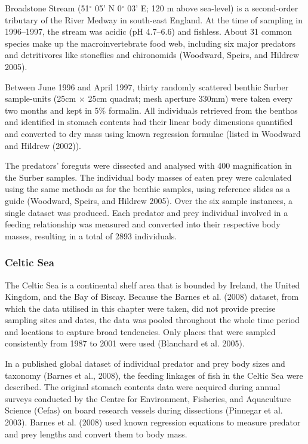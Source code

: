 \documentclass{article}
\begin{document}
Broadstone Stream (51\(^\circ\) 05' N 0\(^\circ\) 03' E; 120 m above
sea-level) is a second-order tributary of the River Medway in south-east
England. At the time of sampling in 1996--1997, the stream was acidic
(pH 4.7--6.6) and fishless. About 31 common species make up the
macroinvertebrate food web, including six major predators and
detritivores like stoneflies and chironomids (Woodward, Speirs, and
Hildrew 2005).

Between June 1996 and April 1997, thirty randomly scattered benthic
Surber sample-units (25cm \(\times\) 25cm quadrat; mesh aperture 330mm)
were taken every two months and kept in 5\% formalin. All individuals
retrieved from the benthos and identified in stomach contents had their
linear body dimensions quantified and converted to dry mass using known
regression formulae (listed in Woodward and Hildrew (2002)).

The predators' foreguts were dissected and analysed with 400
magnification in the Surber samples. The individual body masses of eaten
prey were calculated using the same methods as for the benthic samples,
using reference slides as a guide (Woodward, Speirs, and Hildrew 2005).
Over the six sample instances, a single dataset was produced. Each
predator and prey individual involved in a feeding relationship was
measured and converted into their respective body masses, resulting in a
total of 2893 individuals.

\hypertarget{celtic-sea}{%
\subsubsection{Celtic Sea}\label{celtic-sea}}

The Celtic Sea is a continental shelf area that is bounded by Ireland,
the United Kingdom, and the Bay of Biscay. Because the Barnes et al.
(2008) dataset, from which the data utilised in this chapter were taken,
did not provide precise sampling sites and dates, the data was pooled
throughout the whole time period and locations to capture broad
tendencies. Only places that were sampled consistently from 1987 to 2001
were used (Blanchard et al. 2005).

In a published global dataset of individual predator and prey body sizes
and taxonomy (Barnes et al., 2008), the feeding linkages of fish in the
Celtic Sea were described. The original stomach contents data were
acquired during annual surveys conducted by the Centre for Environment,
Fisheries, and Aquaculture Science (Cefas) on board research vessels
during dissections (Pinnegar et al. 2003). Barnes et al. (2008) used
known regression equations to measure predator and prey lengths and
convert them to body mass.
\end{document}
